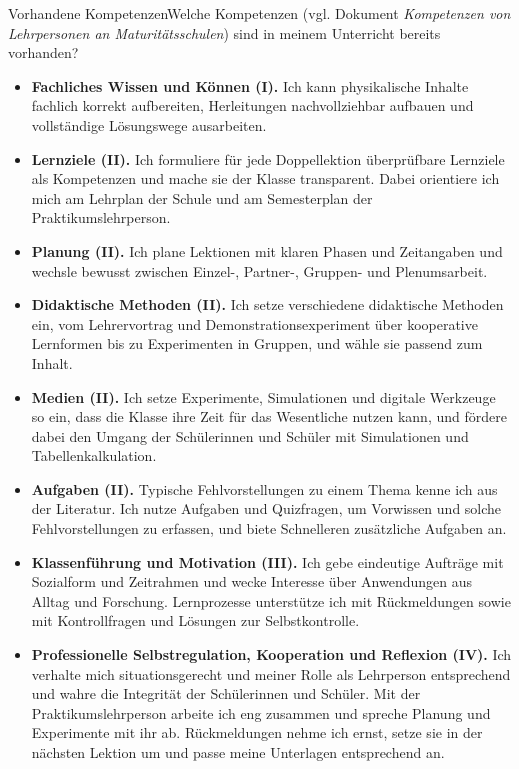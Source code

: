 \documentclass[12pt,a4paper]{article}
\begin{document}
\begin{Formularfeld}{Vorhandene Kompetenzen}{Welche Kompetenzen (vgl.
Dokument \emph{Kompetenzen von Lehrpersonen an Maturitätsschulen}) sind in
meinem Unterricht bereits vorhanden?}

\begin{itemize}
  \item \textbf{Fachliches Wissen und Können (I).} Ich kann physikalische
  Inhalte fachlich korrekt aufbereiten, Herleitungen nachvollziehbar aufbauen
  und vollständige Lösungswege ausarbeiten.

  \item \textbf{Lernziele (II).} Ich formuliere für jede Doppellektion
  überprüfbare Lernziele als Kompetenzen und mache sie der Klasse transparent.
  Dabei orientiere ich mich am Lehrplan der Schule und am Semesterplan der
  Praktikumslehrperson.

  \item \textbf{Planung (II).} Ich plane Lektionen mit klaren Phasen und
  Zeitangaben und wechsle bewusst zwischen Einzel-, Partner-, Gruppen- und
  Plenumsarbeit.

  \item \textbf{Didaktische Methoden (II).} Ich setze verschiedene
  didaktische Methoden ein, vom Lehrervortrag und Demonstrationsexperiment über
  kooperative Lernformen bis zu Experimenten in Gruppen, und wähle sie passend
  zum Inhalt.

  \item \textbf{Medien (II).} Ich setze Experimente, Simulationen und digitale
  Werkzeuge so ein, dass die Klasse ihre Zeit für das Wesentliche nutzen kann,
  und fördere dabei den Umgang der Schülerinnen und Schüler mit Simulationen und
  Tabellenkalkulation.

  \item \textbf{Aufgaben (II).} Typische Fehlvorstellungen zu einem Thema kenne
  ich aus der Literatur. Ich nutze Aufgaben und Quizfragen, um Vorwissen und
  solche Fehlvorstellungen zu erfassen, und biete Schnelleren zusätzliche
  Aufgaben an.

  \item \textbf{Klassenführung und Motivation (III).} Ich gebe eindeutige
  Aufträge mit Sozialform und Zeitrahmen und wecke Interesse über Anwendungen
  aus Alltag und Forschung. Lernprozesse unterstütze ich mit Rückmeldungen
  sowie mit Kontrollfragen und Lösungen zur Selbstkontrolle.

  \item \textbf{Professionelle Selbstregulation, Kooperation und Reflexion
  (IV).} Ich verhalte mich situationsgerecht und meiner Rolle als Lehrperson
  entsprechend und wahre die Integrität der Schülerinnen und Schüler. Mit der
  Praktikumslehrperson arbeite ich eng zusammen und spreche Planung und
  Experimente mit ihr ab. Rückmeldungen nehme ich ernst, setze sie in der
  nächsten Lektion um und passe meine Unterlagen entsprechend an.
\end{itemize}
\end{Formularfeld}
\end{document}
